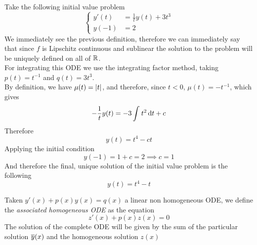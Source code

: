 \documentclass[../complete.tex]{subfiles}
\begin{document}
\begin{eg}
	Take the following initial value problem
	\begin{equation*}
		\left\{\begin{aligned}
			y'(t)&=\frac{1}{t}y(t)+3t^3\\
			y(-1)&=2
		\end{aligned}\right.
	\end{equation*}
	We immediately see the previous definition, therefore we can immediately say that since $f$ is Lipschitz continuous and sublinear the solution to the problem will be uniquely defined on all of $\mathbb{R}$.\\
	For integrating this ODE we use the integrating factor method, taking $p(t)=t^{-1}$ and $q(t)=3t^3$.\\
	By definition, we have $\mu(t)=\abs{t}$, and therefore, since $t<0$, $\mu(t)=-t^{-1}$, which gives
	\begin{equation*}
		-\frac{1}{t}y(t)=-3\int_{}^{}t^2\operatorname{d\!} t+c
	\end{equation*}
	Therefore
	\begin{equation*}
		y(t)=t^4-ct
	\end{equation*}
	Applying the initial condition
	\begin{equation*}
		y(-1)=1+c=2\implies c=1
	\end{equation*}
	And therefore the final, unique solution of the initial value problem is the following
	\begin{equation*}
		y(t)=t^4-t
	\end{equation*}
\end{eg}
\begin{thm}
	Taken $y'(x)+p(x)y(x)=q(x)$ a linear non homogeneous ODE, we define the \textit{associated homogeneous ODE} as the equation
	\begin{equation*}
		z'(x)+p(x)z(x)=0
	\end{equation*}
	The solution of the complete ODE will be given by the sum of the particular solution $\overline{y}(x)$ and the homogeneous solution $z(x)$
\end{thm}
\end{document}
